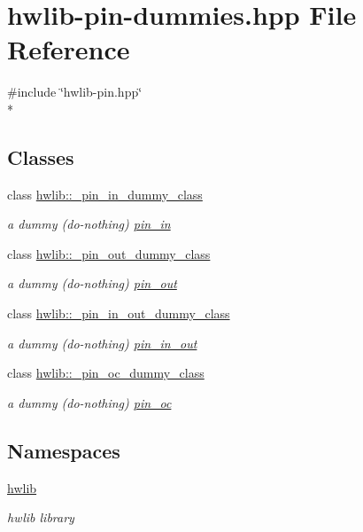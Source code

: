 \hypertarget{hwlib-pin-dummies_8hpp}{}\section{hwlib-\/pin-\/dummies.hpp File Reference}
\label{hwlib-pin-dummies_8hpp}
{\ttfamily \#include \char`\"{}hwlib-\/pin.\+hpp\char`\"{}}\\*
\subsection*{Classes}
\begin{DoxyCompactItemize}
\item 
class \hyperlink{classhwlib_1_1__pin__in__dummy__class}{hwlib\+::\+\_\+pin\+\_\+in\+\_\+dummy\+\_\+class}
\begin{DoxyCompactList}\small\item\em a dummy (do-\/nothing) \hyperlink{classhwlib_1_1pin__in}{pin\+\_\+in} \end{DoxyCompactList}\item 
class \hyperlink{classhwlib_1_1__pin__out__dummy__class}{hwlib\+::\+\_\+pin\+\_\+out\+\_\+dummy\+\_\+class}
\begin{DoxyCompactList}\small\item\em a dummy (do-\/nothing) \hyperlink{classhwlib_1_1pin__out}{pin\+\_\+out} \end{DoxyCompactList}\item 
class \hyperlink{classhwlib_1_1__pin__in__out__dummy__class}{hwlib\+::\+\_\+pin\+\_\+in\+\_\+out\+\_\+dummy\+\_\+class}
\begin{DoxyCompactList}\small\item\em a dummy (do-\/nothing) \hyperlink{classhwlib_1_1pin__in__out}{pin\+\_\+in\+\_\+out} \end{DoxyCompactList}\item 
class \hyperlink{classhwlib_1_1__pin__oc__dummy__class}{hwlib\+::\+\_\+pin\+\_\+oc\+\_\+dummy\+\_\+class}
\begin{DoxyCompactList}\small\item\em a dummy (do-\/nothing) \hyperlink{classhwlib_1_1pin__oc}{pin\+\_\+oc} \end{DoxyCompactList}\end{DoxyCompactItemize}
\subsection*{Namespaces}
\begin{DoxyCompactItemize}
\item 
 \hyperlink{namespacehwlib}{hwlib}
\begin{DoxyCompactList}\small\item\em hwlib library \end{DoxyCompactList}\end{DoxyCompactItemize}

